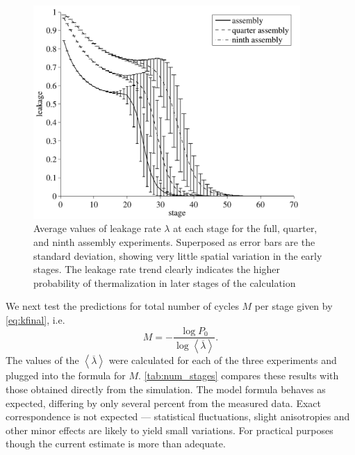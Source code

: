 \begin{figure}[ht!]
  \centering
  \includegraphics[width=4.0in]{figures/ch5/avg_leakage.pdf}
  \caption{Average values of leakage rate $\lambda$ at each stage for the full,
    quarter, and ninth assembly experiments. Superposed as error bars are the
    standard deviation, showing very little spatial variation in the early
    stages. The leakage rate trend clearly indicates the higher probability of
    thermalization in later stages of the calculation}
  \label{fig:avg_leakage}
\end{figure}


We next test the predictions for total number of cycles $M$ per stage given by
\eqref{eq:kfinal}, i.e.
\begin{equation*}
  M = -\frac{\log P_0}{\log \left<\overline{\lambda}\right>}.
\end{equation*}
The values of the $\left<\overline{\lambda}\right>$ were calculated for each of
the three experiments and plugged into the formula for
$M$. \autoref{tab:num_stages} compares these results with those obtained
directly from the simulation.  The model formula behaves as expected, differing
by only several percent from the measured data.  Exact correspondence is not
expected --- statistical fluctuations, slight anisotropies and other minor
effects are likely to yield small variations. For practical purposes though the
current estimate is more than adequate.

